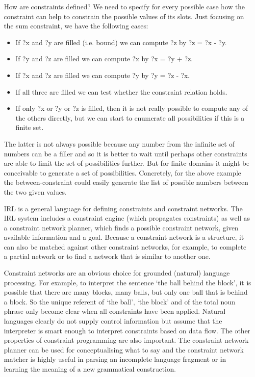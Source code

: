 How are constraints defined? We need to specify for every possible case how the constraint can help to 
constrain the possible values of its slots. 
Just focusing on the sum constraint, we have the following cases:
\begin{itemize}
\item If ?x and ?y are filled (i.e. bound) 
we can compute ?z by ?z = ?x - ?y. 
\item If ?y and ?z are filled we can compute ?x by ?x = ?y + ?z. 
\item If ?x and ?z are filled we can compute ?y by ?y = ?z - ?x. 
\item If all three are filled we can test whether the constraint relation holds. 
\item If only ?x or ?y or ?z is filled, then it is not really possible to compute any of the others directly, but we can start 
to enumerate all possibilities if this is a finite set. 
\end{itemize}
The latter is not always possible because any number from the infinite set of numbers can be a filler 
and so it is better to wait until 
perhaps other constraints are able to limit the set of possibilities further. But for finite domains 
it might be conceivable to generate a set of possibilities. Concretely, for the above example  
the between-constraint could easily generate the list of possible numbers between the two given values.

IRL is a general language for defining constraints and constraint networks. The IRL system includes a 
constraint engine (which propagates constraints) as well as a constraint network planner, which finds a possible 
constraint network, given available information and a goal. Because a constraint network is a structure, it 
can also be matched against other constraint networks, for example, to complete a partial network or to find a network 
that is similar to another one. 

Constraint networks are an obvious choice for grounded (natural) language processing. 
For example, to interpret the sentence `the ball behind
the block', it is possible that there are many blocks, many balls, but only one ball that is behind a block. So the 
unique referent of `the ball', `the block' and of the total noun phrase only become clear when 
all constraints have been applied. Natural languages clearly do not supply control information but assume that 
the interpreter is smart enough to interpret constraints based on data flow. The other properties of constraint 
programming are also important. The constraint network planner can be used for conceptualising what to say and 
the constraint network matcher is highly useful in parsing an incomplete language fragment or in learning the 
meaning of a new grammatical construction.

